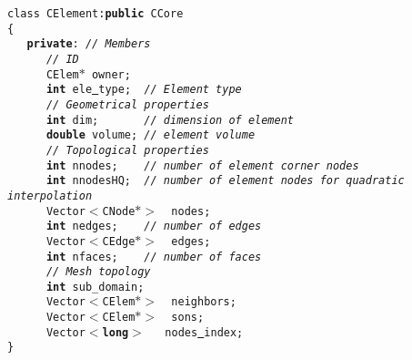 {
\sffamily \raggedright \scriptsize
\texttt{class\ CElement:\textbf{public}\ CCore\\
\{\\
\ \ \ \textbf{private}:\ \textsl{//\ Members}\\
\ \ \ \ \ \ \textsl{//\ ID}\\
\ \ \ \ \ \ CElem$\ast$\ owner;\\
\ \ \ \ \ \ \textbf{int}\ ele\underline\ type;\ \ \textsl{//\ Element\ type}\\
\ \ \ \ \ \ \textsl{//\ Geometrical properties}\\
\ \ \ \ \ \ \textbf{int}\ dim;\ \ \ \ \ \ \ \textsl{//\ dimension\ of\ element}\\
\ \ \ \ \ \ \textbf{double}\ volume;\ \textsl{// element volume}\\
\ \ \ \ \ \ \textsl{//\ Topological properties}\\
\ \ \ \ \ \ \textbf{int}\ nnodes;\ \ \ \ \textsl{//\ number\ of element corner nodes}\\
\ \ \ \ \ \ \textbf{int}\ nnodesHQ;\ \ \textsl{//\ number of element nodes for quadratic interpolation}\\
\ \ \ \ \ \ Vector$<${}CNode$\ast>${}\ \ nodes;\\
\ \ \ \ \ \ \textbf{int}\ nedges;\ \ \ \ \textsl{//\ number\ of\ edges}\\
\ \ \ \ \ \ Vector$<${}CEdge$\ast>${}\ \ edges;\\
\ \ \ \ \ \ \textbf{int}\ nfaces;\ \ \ \ \textsl{//\ number\ of\ faces}\\
\ \ \ \ \ \ \textsl{//\ Mesh topology}\\
\ \ \ \ \ \ \textbf{int}\ sub\_domain;\\
\ \ \ \ \ \ Vector$<${}CElem$\ast>${}\ \ neighbors;\\
\ \ \ \ \ \ Vector$<${}CElem$\ast>${}\ \ sons;\\
\ \ \ \ \ \ Vector$<${}\textbf{long}$>${}\ \ \ nodes\underline\ index;\\
\}\\
}
 }
\normalfont\normalsize
